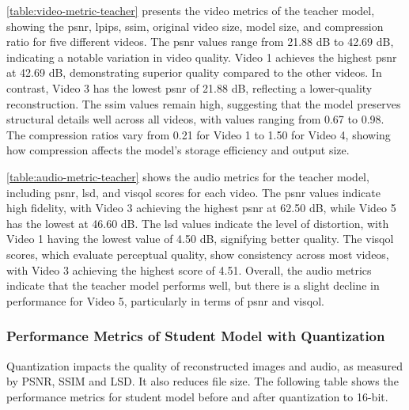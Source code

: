     \autoref{table:video-metric-teacher} presents the video metrics of the teacher model, showing the \gls{psnr}, \gls{lpips}, \gls{ssim}, original video size, model size, and compression ratio for five different videos. The \gls{psnr} values range from 21.88 dB to 42.69 dB, indicating a notable variation in video quality. Video 1 achieves the highest \gls{psnr} at 42.69 dB, demonstrating superior quality compared to the other videos. In contrast, Video 3 has the lowest \gls{psnr} of 21.88 dB, reflecting a lower-quality reconstruction. The \gls{ssim} values remain high, suggesting that the model preserves structural details well across all videos, with values ranging from 0.67 to 0.98. The compression ratios vary from 0.21 for Video 1 to 1.50 for Video 4, showing how compression affects the model's storage efficiency and output size.

    \autoref{table:audio-metric-teacher} shows the audio metrics for the teacher model, including \gls{psnr}, \gls{lsd}, and \gls{visqol} scores for each video. The \gls{psnr} values indicate high fidelity, with Video 3 achieving the highest \gls{psnr} at 62.50 dB, while Video 5 has the lowest at 46.60 dB. The \gls{lsd} values indicate the level of distortion, with Video 1 having the lowest value of 4.50 dB, signifying better quality. The \gls{visqol} scores, which evaluate perceptual quality, show consistency across most videos, with Video 3 achieving the highest score of 4.51. Overall, the audio metrics indicate that the teacher model performs well, but there is a slight decline in performance for Video 5, particularly in terms of \gls{psnr} and \gls{visqol}.


\subsubsection{Performance Metrics of Student Model with Quantization}
    Quantization impacts the quality of reconstructed images and audio, as measured by PSNR, SSIM and LSD. It also reduces file size. The following table shows the performance metrics for student model before and after quantization to 16-bit.


